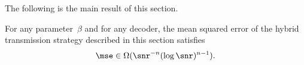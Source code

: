 The following is the main result of this section.
\begin{theorem}
  \label{thm:scalinglb}
  For any parameter~$\beta$ and for any decoder, the mean squared error of the
  hybrid transmission strategy described in this section satisfies
  \begin{equation*}
    \mse \in \Omega(\snr^{-n}(\log\snr)^{n-1}).
  \end{equation*}
\end{theorem}


